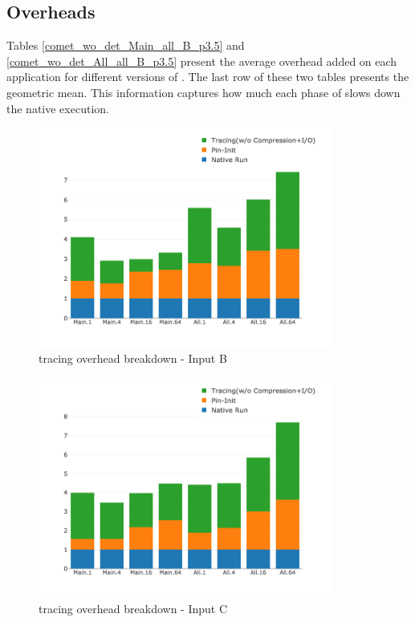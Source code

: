   
\subsection{Overheads} 
\label{subsec:pinit}
Tables \ref{comet_wo_det_Main_all_B_p3.5} and
\ref{comet_wo_det_All_all_B_p3.5} present the average overhead added on each
application for different versions of \parlot. 
%
The last row of these two tables
presents the geometric mean.
%
This information captures how much each
phase of \parlot slows down the native execution. 





\begin{figure}[t]
\centering
\includegraphics[width=3.8in]{figs.comet.newMed/comet_chartDet_B_woc_byTool_p3_5.png}
\caption{\parlotnc tracing overhead breakdown - Input B}
\label{comet_chartDet_B_woc_byTool_p3_5}
\end{figure}

\begin{figure}[t]
\centering
\includegraphics[width=3.8in]{figs.comet.newMed/comet_chartDet_C_woc_byTool_p3_5.png}
\caption{ \parlotnc tracing overhead breakdown - Input C}
\label{comet_chartDet_C_woc_byTool_p3_5}
\end{figure}


